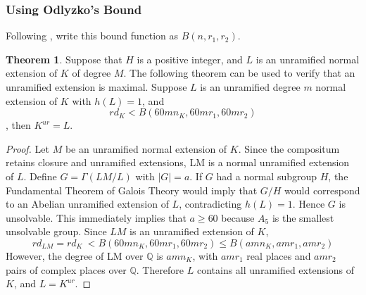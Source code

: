 \documentclass[12pt]{extarticle}
\newcommand{\Q}{\mathbb{Q}}
\newcommand{\<}{\langle}
\renewcommand{\>}{\rangle}
\theoremstyle{definition}
\newtheorem{theorem}{Theorem}
\begin{document}
\subsubsection*{Using Odlyzko's Bound}
Following \cite{YAMA1986}, write this bound function as $B(n,r_1,r_2)$.
\begin{theorem}
Suppose that $H$ is a positive integer, and $L$ is an unramified normal extension of $K$ of degree $M$. The following theorem can be used to verify that an unramified extension is maximal. Suppose $L$ is an unramified degree $m$  normal extension of $K$ with $h(L)=1$, and 
\begin{equation}
        rd_K<B(60mn_K,60mr_1,60mr_2)
    \end{equation}
, then $K^{ur}=L$.
\end{theorem}
\begin{proof}
Let $M$ be an unramified normal extension of $K$. Since the compositum retains closure and unramified extensions, LM is a normal unramified extension of $L$. Define $G=\Gamma(LM/L)$ with $|G|=a$. If $G$ had a normal subgroup $H$, the Fundamental Theorem of Galois Theory would imply that $G/H$ would correspond to an Abelian unramified extension of $L$, contradicting $h(L)=1$. Hence $G$ is unsolvable. This immediately implies that $a\geqslant 60$ because $A_5$ is the 
smallest unsolvable group. Since $LM$ is an unramified extension of $K$, \begin{equation}
    rd_{LM}=rd_{K}\ < B(60mn_K,60mr_1,60mr_2)\leq  B(amn_K,amr_1,amr_2)
\end{equation} 
However, the degree of LM over $\Q$ is $amn_K$, with $amr_1$ real places and $amr_2$ pairs of complex places over $\Q$. Therefore $L$ contains all unramified extensions of $K$, and $L=K^{ur}$.
\end{proof}
\end{document}
